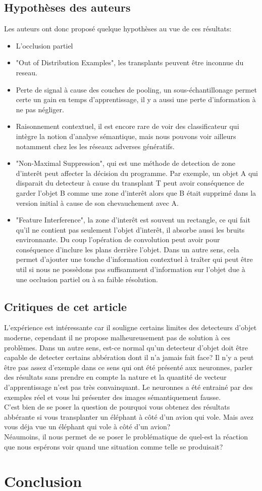\documentclass[12pt, letterpaper]{article}
\begin{document}
\subsection{Hypothèses des auteurs}
Les auteurs ont donc proposé quelque hypothèses au vue de ces résultats:
\begin{itemize}
    \item L'occlusion partiel
    \item "Out of Distribution Examples", les transplants peuvent être inconnue du reseau.
    \item Perte de signal à cause des couches de pooling, un sous-échantillonage permet certe un gain en temps d'apprentissage, il y a aussi une perte d'information à ne pas négliger.
    \item Raisonnement contextuel, il est encore rare de voir des classificateur qui intègre la notion d'analyse sémantique, mais nous pouvons voir ailleurs notamment chez les
        les réseaux adverses génératifs.
    \item "Non-Maximal Suppression", qui est une méthode de detection de zone d'interêt peut affecter la décision du programme.
        Par exemple, un objet A qui disparait du detecteur à cause du transplant T peut avoir conséquence de garder l'objet B comme une zone d'interêt alors que B était supprimé dans la version initial à cause de son 
        chevauchement avec A.
    \item "Feature Interference", la zone d'interêt est souvent un rectangle, ce qui fait qu'il ne contient pas seulement l'objet d'interêt, il absorbe aussi les bruits environnante. Du coup l'opération 
    de convolution peut avoir pour conséquence d'inclure les plans derrière l'objet. Dans un autre sens, cela permet d'ajouter une touche d'information contextuel à traîter qui peut être util si nous ne possèdons 
    pas suffisamment d'information sur l'objet due à une occlusion partiel ou à sa faible résolution.
\end{itemize}
\subsection{Critiques de cet article}
L'expérience est intéressante car il souligne certains limites des detecteurs d'objet moderne, cependant il ne propose malheureusement pas de solution à ces problèmes.
Dans un autre sens, est-ce normal qu'un detecteur d'objet doit être capable de detecter certains abbération dont il n'a jamais fait face? 
Il n'y a peut être pas assez d'exemple dans ce sens qui ont été présenté aux neuronnes, parler des résultats sans prendre en compte la nature et la quantité 
de vecteur d'apprentissage n'est pas très convainquant. Le neuronnes a été entrainé par des exemples réel et vous lui présenter des images sémantiquement fausse.\\
C'est bien de se poser la question de pourquoi vous obtenez des résultats abbérante si vous transplanter un éléphant à côté d'un avion qui vole. Mais avez vous déja vue 
un éléphant qui vole à côté d'un avion? \\
Néaumoins, il nous permet de se poser le problématique de quel-est la réaction que nous espérons voir quand une situation comme telle se produisait? 

\section{Conclusion}


\newpage
\printbibliography
\end{document}
